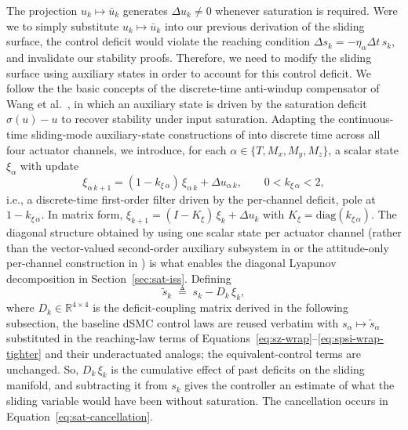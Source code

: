 \documentclass[conf]{new-aiaa}
\begin{document}
The projection $u_k \mapsto \bar u_k$ generates $\Delta u_k \neq 0$ whenever saturation is required. Were we to simply substitute $u_k \mapsto \bar u_k$ into our previous derivation of the sliding surface, the control deficit would violate the reaching condition $\Delta s_k = -\eta_\alpha \Delta t\, s_k$, and invalidate our stability proofs. Therefore, we need to modify the sliding surface using auxiliary states in order to account for this control deficit. We follow the the basic concepts of the discrete-time anti-windup compensator of Wang et al.\ \cite{refs:Wang2005}, in which an auxiliary state is driven by the saturation deficit $\sigma(u) - u$ to recover stability under input saturation. Adapting the continuous-time sliding-mode auxiliary-state constructions of \cite{refs:Xu2020, refs:Kuang2024} into discrete time across all four actuator channels, we introduce, for each $\alpha \in \{T, M_x, M_y, M_z\}$, a scalar state $\xi_\alpha$ with update
\small
\begin{equation}
\label{eq:sat-xi-update}
\xi_{\alpha\, k+1} = (1 - k_{\xi\, \alpha})\, \xi_{\alpha\, k} + \Delta u_{\alpha\, k},
\qquad 0 < k_{\xi\, \alpha} < 2,
\end{equation}
\normalsize
i.e., a discrete-time first-order filter driven by the per-channel deficit, pole at $1 - k_{\xi\,\alpha}$. In matrix form, $\xi_{k+1} = (I - K_\xi)\, \xi_k + \Delta u_k$ with $K_\xi = \mathrm{diag}(k_{\xi\, \alpha})$. The diagonal structure obtained by using one scalar state per actuator channel (rather than the vector-valued second-order auxiliary subsystem in \cite{refs:Kuang2024} or the attitude-only per-channel construction in \cite{refs:Xu2020}) is what enables the diagonal Lyapunov decomposition in Section~\ref{sec:sat-iss}. Defining
\begin{equation}
\label{eq:sat-tilde-s}
\tilde s_k \;\triangleq\; s_k - D_k\, \xi_k,
\end{equation}
where $D_k \in \mathbb{R}^{4 \times 4}$ is the deficit-coupling matrix derived in the following subsection, the baseline dSMC control laws are reused verbatim with $s_\alpha \mapsto \tilde s_\alpha$ substituted in the reaching-law terms of Equations~\ref{eq:sz-wrap}–\ref{eq:spsi-wrap-tighter} and their underactuated analogs; the equivalent-control terms are unchanged. So, $D_k\,\xi_k$ is the cumulative effect of past deficits on the sliding manifold, and subtracting it from $s_k$ gives the controller an estimate of what the sliding variable would have been without saturation. The cancellation occurs in Equation~\ref{eq:sat-cancellation}.
\end{document}
